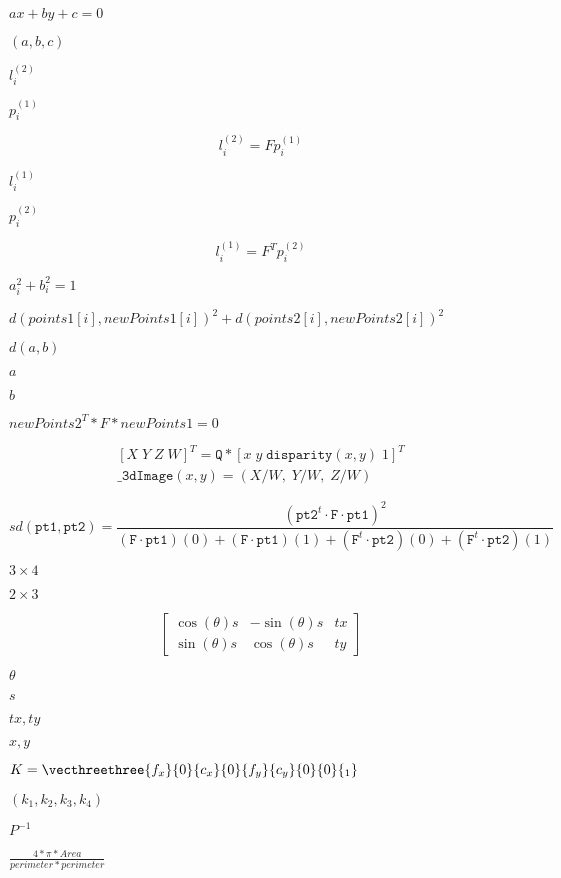 \documentclass{article}
\begin{document}
$ax + by + c=0$
\pagebreak

$(a, b, c)$
\pagebreak

$l^{(2)}_i$
\pagebreak

$p^{(1)}_i$
\pagebreak

\[l^{(2)}_i = F p^{(1)}_i\]
\pagebreak

$l^{(1)}_i$
\pagebreak

$p^{(2)}_i$
\pagebreak

\[l^{(1)}_i = F^T p^{(2)}_i\]
\pagebreak

$a_i^2+b_i^2=1$
\pagebreak

$d(points1[i], newPoints1[i])^2 + d(points2[i],newPoints2[i])^2$
\pagebreak

$d(a,b)$
\pagebreak

$a$
\pagebreak

$b$
\pagebreak

$newPoints2^T * F * newPoints1 = 0$
\pagebreak

\[\begin{array}{l} [X \; Y \; Z \; W]^T = \texttt{Q} *[x \; y \; \texttt{disparity} (x,y) \; 1]^T \\ \texttt{\_3dImage} (x,y) = (X/W, \; Y/W, \; Z/W) \end{array}\]
\pagebreak

\[sd( \texttt{pt1} , \texttt{pt2} )= \frac{(\texttt{pt2}^t \cdot \texttt{F} \cdot \texttt{pt1})^2}{(\texttt{F} \cdot \texttt{pt1})(0) + (\texttt{F} \cdot \texttt{pt1})(1) + (\texttt{F}^t \cdot \texttt{pt2})(0) + (\texttt{F}^t \cdot \texttt{pt2})(1)}\]
\pagebreak

$3 \times 4$
\pagebreak

$2 \times 3$
\pagebreak

\[ \begin{bmatrix} \cos(\theta)s & -\sin(\theta)s & tx \\ \sin(\theta)s & \cos(\theta)s & ty \end{bmatrix} \]
\pagebreak

$ \theta $
\pagebreak

$ s $
\pagebreak

$ tx, ty $
\pagebreak

$ x, y $
\pagebreak

$K = \vecthreethree{f_x}{0}{c_x}{0}{f_y}{c_y}{0}{0}{_1}$
\pagebreak

$(k_1, k_2, k_3, k_4)$
\pagebreak

$P^{-1}$
\pagebreak

$\frac{4*\pi*Area}{perimeter * perimeter}$
\pagebreak
\end{document}
